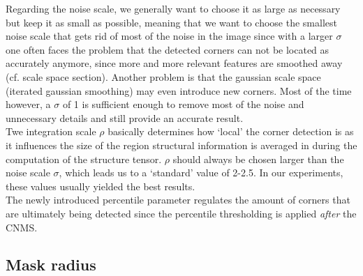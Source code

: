 Regarding the noise scale, we generally want to choose it as large as necessary but keep it as small as
possible, meaning that we want to choose the smallest noise scale that gets rid of most of the
noise in the image since with a larger $\sigma$ 
one often faces the problem that the detected corners can not be located as accurately anymore,
since more and more relevant features are smoothed away (cf. scale space section). Another problem
is that the gaussian scale space (iterated gaussian smoothing) may even introduce new
corners.\cite{weickert96}
 Most of the time however, a $\sigma$ of 1 is sufficient enough to remove most of the noise and unnecessary
 details and still provide an accurate result.\\
Twe integration scale $\rho$ basically determines how `local' 
the corner detection is as it influences the size of the region structural information is averaged
in during the computation of the structure tensor. $\rho$ should always be chosen larger than the noise
scale $\sigma$, which leads us to a `standard' value of 2-2.5. In our experiments, these values
usually yielded the best results.\\
The newly introduced percentile parameter regulates the amount of corners that are ultimately being
detected since the percentile thresholding is applied \textit{after} the CNMS. 

\subsection{Mask radius}



